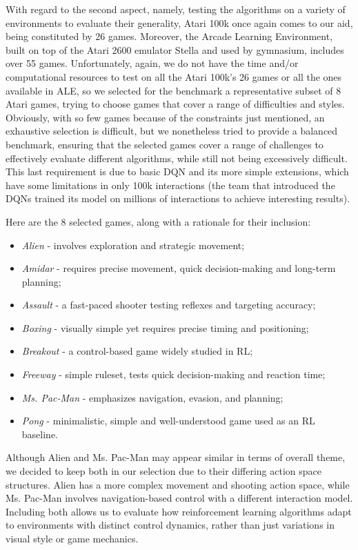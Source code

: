 With regard to the second aspect, namely, testing the algorithms on a variety of environments to evaluate their generality, Atari 100k once again comes to our aid, being constituted by 26 games. Moreover, the Arcade Learning Environment, built on top of the Atari 2600 emulator Stella and used by gymnasium, includes over 55 games. Unfortunately, again, we do not have the time and/or computational resources to test on all the Atari \num{100}k's 26 games or all the ones available in ALE, so we selected for the benchmark a representative subset of 8 Atari games, trying to choose games that cover a range of difficulties and styles. Obviously, with so few games because of the constraints just mentioned, an exhaustive selection is difficult, but we nonetheless tried to provide a balanced benchmark, ensuring that the selected games cover a range of challenges to effectively evaluate different algorithms, while still not being excessively difficult. This last requirement is due to basic DQN and its more simple extensions, which have some limitations in only 100k interactions (the team that introduced the DQNs trained its model on millions of interactions to achieve interesting results).

Here are the 8 selected games, along with a rationale for their inclusion:
\begin{itemize}
	\item \textit{Alien} - involves exploration and strategic movement;
	\item \textit{Amidar} - requires precise movement, quick decision-making and long-term planning;
	\item \textit{Assault} - a fast-paced shooter testing reflexes and targeting accuracy;
	\item \textit{Boxing} - visually simple yet requires precise timing and positioning;
	\item \textit{Breakout} - a control-based game widely studied in RL;
	\item \textit{Freeway} - simple ruleset, tests quick decision-making and reaction time;
	\item \textit{Ms. Pac-Man} - emphasizes navigation, evasion, and planning;
	\item \textit{Pong} - minimalistic, simple and well-understood game used as an RL baseline.
\end{itemize}

Although Alien and Ms. Pac-Man may appear similar in terms of overall theme, we decided to keep both in our selection due to their differing action space structures. Alien has a more complex movement and shooting action space, while Ms. Pac-Man involves navigation-based control with a different interaction model. Including both allows us to evaluate how reinforcement learning algorithms adapt to environments with distinct control dynamics, rather than just variations in visual style or game mechanics.

